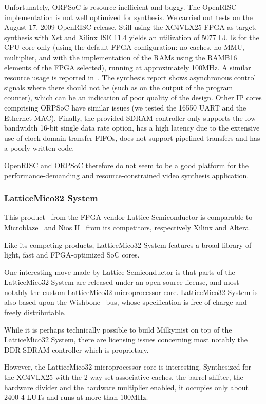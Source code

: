 \documentclass[a4paper,11pt]{kthesis}
\begin{document}
Unfortunately, ORPSoC is resource-inefficient and buggy. The OpenRISC implementation is not well optimized for synthesis. We carried out tests on the August 17, 2009 OpenRISC release. Still using the XC4VLX25 FPGA as target, synthesis with Xst and Xilinx ISE 11.4 yields an utilization of 5077 LUTs for the CPU core only (using the default FPGA configuration: no caches, no MMU, multiplier, and with the implementation of the RAMs using the RAMB16 elements of the FPGA selected), running at approximately 100MHz. A similar resource usage is reported in~\cite{softcorecomp}. The synthesis report shows asynchronous control signals where there should not be (such as on the output of the program counter), which can be an indication of poor quality of the design. Other IP cores comprising ORPSoC have similar issues (we tested the 16550 UART and the Ethernet MAC). Finally, the provided SDRAM controller only supports the low-bandwidth 16-bit single data rate option, has a high latency due to the extensive use of clock domain transfer FIFOs, does not support pipelined transfers and has a poorly written code.

OpenRISC and ORPSoC therefore do not seem to be a good platform for the performance-demanding and resource-constrained video synthesis application.

\subsubsection{LatticeMico32 System}
This product~\cite{mico32} from the FPGA vendor Lattice Semiconductor is comparable to Microblaze~\cite{microblaze} and Nios II~\cite{nios} from its competitors, respectively Xilinx and Altera.

Like its competing products, LatticeMico32 System features a broad library of light, fast and FPGA-optimized SoC cores.

One interesting move made by Lattice Semiconductor is that parts of the LatticeMico32 System are released under an open source license, and most notably the custom LatticeMico32 microprocessor core. LatticeMico32 System is also based upon the Wishbone~\cite{wishbone} bus, whose specification is free of charge and freely distributable.

While it is perhaps technically possible to build Milkymist on top of the LatticeMico32 System, there are licensing issues concerning most notably the DDR SDRAM controller which is proprietary.

However, the LatticeMico32 microprocessor core is interesting. Synthesized for the XC4VLX25 with the 2-way set-associative caches, the barrel shifter, the hardware divider and the hardware multiplier enabled, it occupies only about 2400 4-LUTs and runs at more than 100MHz.
\end{document}

